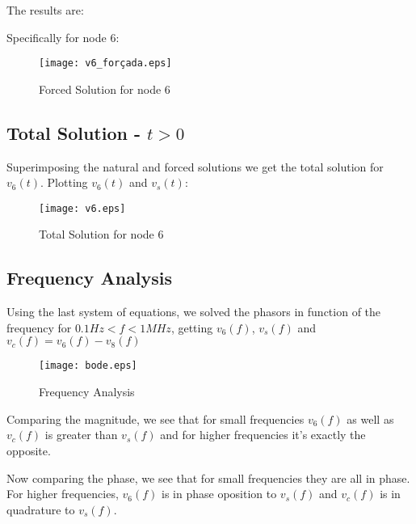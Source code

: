 The results are:



Specifically for node 6:

\begin{figure}[h] \centering
\texttt{[image: v6\_forçada.eps]}
\caption{Forced Solution for node 6}
\label{fig:forced}
\end{figure}



\subsection{Total Solution - $t>0$}

Superimposing the natural and forced solutions we get the total solution for $v_{6}(t)$.
Plotting $v_{6}(t)$ and $v_{s}(t)$:

\begin{figure}[h] \centering
\texttt{[image: v6.eps]}
\caption{Total Solution for node 6}
\label{fig:total}
\end{figure}


\subsection{Frequency Analysis}

Using the last system of equations, we solved the phasors in function of the frequency for $0.1Hz<f<1MHz$, getting $v_{6}(f)$, $v_{s}(f)$ and $v_{c}(f)=v_{6}(f)-v_{8}(f)$

\begin{figure}[h] \centering
\texttt{[image: bode.eps]}
\caption{Frequency Analysis}
\label{fig:frequency}
\end{figure}

Comparing the magnitude, we see that for small frequencies  $v_{6}(f)$ as well as $v_{c}(f)$ is greater than $v_{s}(f)$ and for higher frequencies it's exactly the opposite.

Now comparing the phase, we see that for small frequencies they are all in phase. For higher frequencies, $v_{6}(f)$ is in phase oposition to $v_{s}(f)$ and $v_{c}(f)$ is in quadrature to $v_{s}(f)$.
